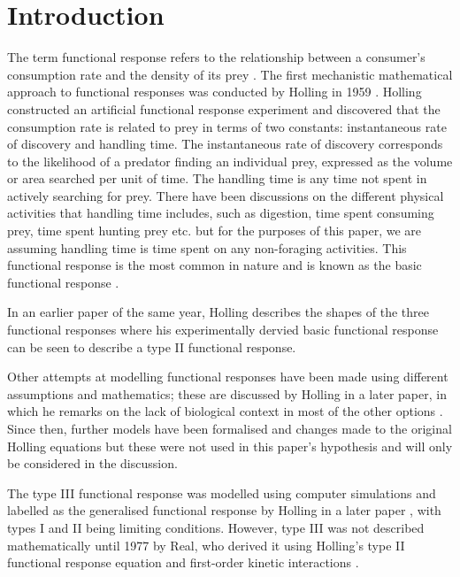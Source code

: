 \documentclass[11pt, a4paper, titlepage]{article}
\begin{document}
\newpage

\linenumbers




\section{Introduction}
The term functional response refers to the relationship between a consumer's consumption rate and the density of its prey \parencite{Solomon1949}.  The first mechanistic mathematical approach to functional responses was conducted by Holling in 1959 \parencite{Holling1959b}. Holling constructed an artificial functional response experiment and discovered that the consumption rate is related to prey in terms of two constants: instantaneous rate of discovery and handling time. The instantaneous rate of discovery corresponds to the likelihood of a predator finding an individual prey, expressed as the volume or area searched per unit of time.
The handling time is any time not spent in actively searching for prey. There have been discussions on the different physical activities that handling time includes, such as digestion, time spent consuming prey, time spent hunting prey etc. \parencite{Jeschke2002, Holling1966} but for the purposes of this paper, we are assuming handling time is time spent on any non-foraging activities.
This functional response is the most common in nature and is known as the basic functional response \parencite{Holling1959b}.

In an earlier paper of the same year, Holling describes the shapes of the three functional responses \parencite{Holling1959a} where his experimentally dervied basic functional response can be seen to describe a type II functional response.

Other attempts at modelling functional responses have been made using different assumptions and mathematics; these are discussed by Holling in a later paper, in which he remarks on the lack of biological context in most of the other options \parencite{Holling1965}. Since then, further models have been formalised and changes made to the original Holling equations but these were not used in this paper's hypothesis and  will only be considered in the discussion. 

\bigskip

The type III functional response was modelled using computer simulations and labelled as the generalised functional response by Holling in a later paper \parencite{Holling1965}, with types I and II being limiting conditions. However, type III was not described mathematically until 1977 by Real, who derived it using Holling's type II functional response equation and first-order kinetic interactions \parencite{Real1977}.
 
\end{document}
